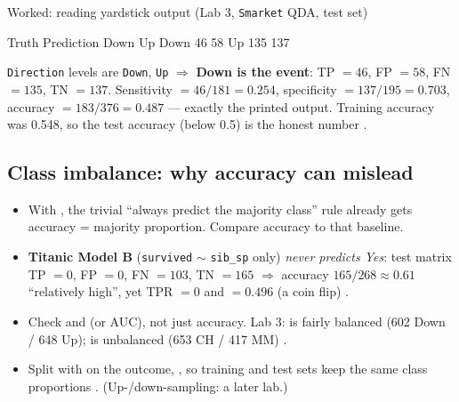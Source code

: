 \begin{qbox}{Worked: reading yardstick output (Lab 3, \texttt{Smarket} QDA, test set)}
%
\begin{routput}
          Truth
Prediction Down  Up
      Down   46  58
      Up    135 137
\end{routput}
\texttt{Direction} levels are \texttt{Down}, \texttt{Up} $\Rightarrow$ \textbf{Down is the event}: TP $=46$, FP $=58$,
FN $=135$, TN $=137$. Sensitivity $=46/181=0.254$, specificity $=137/195=0.703$, accuracy $=183/376=0.487$ ---
exactly the printed  output. Training accuracy was 0.548,
so the test accuracy (below 0.5) is the honest number .
\end{qbox}

\subsection{Class imbalance: why accuracy can mislead}
\begin{itemize}
\item With , the trivial ``always predict the majority class'' rule already gets
  accuracy = majority proportion. Compare accuracy to that baseline.
\item \textbf{Titanic Model B} (\texttt{survived} $\sim$ \texttt{sib\_sp} only) \emph{never predicts Yes}: test
  matrix TP $=0$, FP $=0$, FN $=103$, TN $=165$ $\Rightarrow$ accuracy $165/268\approx0.61$ ``relatively high'',
  yet TPR $=0$ and  $=0.496$ (a coin flip) .
\item Check  and  (or AUC), not just accuracy.
  Lab 3:  is fairly balanced (602 Down / 648 Up);  is unbalanced (653 CH / 417 MM) .
\item Split with  on the outcome, , so training and test sets keep the
  same class proportions . (Up-/down-sampling: a later lab.)
\end{itemize}

